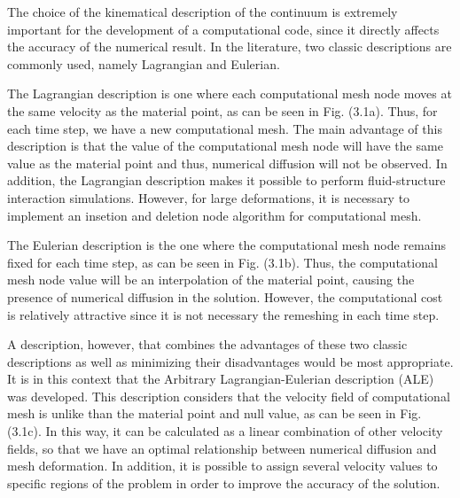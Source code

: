 The choice of the kinematical description of the continuum is 
extremely important for the development of a computational code, 
since it directly affects the accuracy of the numerical result. 
In the literature, two classic descriptions are commonly used, 
namely Lagrangian and Eulerian.

\medskip
The Lagrangian description is one where each computational mesh node 
moves at the same velocity as the material point, as can be seen in
 Fig. (3.1a). Thus, for each time step, we have a new computational mesh. 
The main advantage of this description is that the value of the 
computational mesh node will have the same value as the material point
 and thus, numerical diffusion will not be observed. In addition, 
the Lagrangian description makes it possible to perform 
fluid-structure interaction simulations. However, for large 
deformations, it is necessary to implement an insetion and deletion
node algorithm for computational mesh.

\medskip
The Eulerian description is the one where the computational mesh node 
remains fixed for each time step, as can be seen in Fig. (3.1b).
Thus, the computational mesh node value will be an interpolation 
of the material point, causing the presence of numerical diffusion 
in the solution. However, the computational cost is relatively 
attractive since it is not necessary the remeshing in each time step.

\medskip
A description, however, that combines the advantages of these two 
classic descriptions as well as minimizing their disadvantages would be
most appropriate. It is in this context that the Arbitrary 
Lagrangian-Eulerian description (ALE) was developed. 
This description considers that the velocity field of computational 
mesh is unlike than the material point and null value, as can be seen 
in Fig. (3.1c). In this way, it can be calculated as a 
linear combination of other velocity fields, so that we have an 
optimal relationship between numerical diffusion and mesh deformation. 
In addition, it is possible to assign several velocity values to 
specific regions of the problem in order to improve the 
accuracy of the solution.



